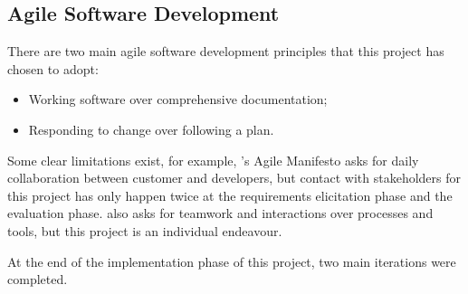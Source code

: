 \subsection{Agile Software Development}

There are two main agile software development principles that this project has chosen to adopt:

\begin{itemize}
    \setlength\itemsep{0em}        
    \item Working software over comprehensive documentation;
    \item Responding to change over following a plan.\\
    \citep{beck2001agile}    
\end{itemize}

Some clear limitations exist, for example, \citet{beck2001agile}'s Agile Manifesto asks for 
daily collaboration between customer and developers, but contact with stakeholders 
for this project has only happen twice at the requirements elicitation 
phase and the evaluation phase. \citet{beck2001agile} also asks for teamwork and 
interactions over processes and tools, but this project is an individual endeavour.

At the end of the implementation phase of this project, two main iterations were completed.
